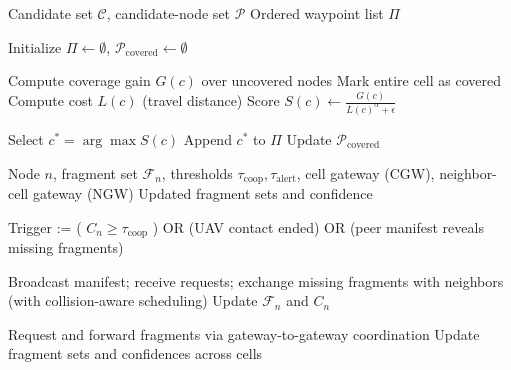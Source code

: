 \documentclass[conference]{IEEEtran}
\begin{document}
\begin{algorithm}[t]
\caption{Coverage-Aware UAV Path Planning (GMC)}
\label{alg:gmc}
\begin{algorithmic}[1]
\Require Candidate set $\mathcal{C}$, candidate-node set $\mathcal{P}$
\Ensure Ordered waypoint list $\Pi$

\State Initialize $\Pi \gets \emptyset$, $\mathcal{P}_{\text{covered}} \gets \emptyset$

        \State Compute coverage gain $G(c)$ over uncovered nodes
            \State Mark entire cell as covered
        \EndIf
        \State Compute cost $L(c)$ (travel distance)
        \State Score $S(c) \gets \frac{G(c)}{L(c)^\alpha + \epsilon}$
    \EndFor

    \State Select $c^* = \arg\max S(c)$
    \State Append $c^*$ to $\Pi$
    \State Update $\mathcal{P}_{\text{covered}}$
\EndWhile
\end{algorithmic}
\end{algorithm}
\begin{algorithm}[t]
\caption{Cooperative Exchange (Intra- and Inter-cell)}
\label{alg:coop}
\begin{algorithmic}[1]
\Require Node $n$, fragment set $\mathcal{F}_n$, thresholds $\tau_{\text{coop}},\tau_{\text{alert}}$, cell gateway (CGW), neighbor-cell gateway (NGW)
\Ensure Updated fragment sets and confidence

\State Trigger := ( $C_n \ge \tau_{\text{coop}}$ ) 
       OR (UAV contact ended) 
       OR (peer manifest reveals missing fragments)

    \State Broadcast manifest; receive requests; exchange missing fragments with neighbors (with collision-aware scheduling)
    \State Update $\mathcal{F}_n$ and $C_n$
\EndIf

        \State Request and forward fragments via gateway-to-gateway coordination
        \State Update fragment sets and confidences across cells
    \EndIf
\EndIf
\end{algorithmic}
\end{algorithm}
\end{document}
